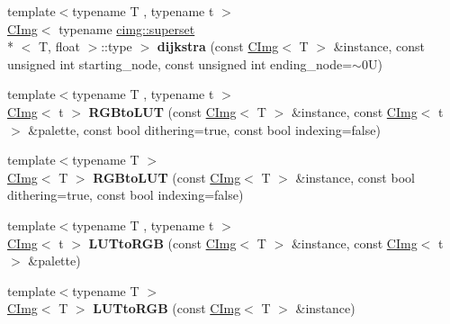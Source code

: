 \begin{DoxyCompactItemize}
\item 
\hypertarget{namespacecimg__library_ac8445474c26aa558fc2d8a1d3cc8eed4}{{\footnotesize template$<$typename T , typename t $>$ }\\\hyperlink{structcimg__library_1_1_c_img}{C\-Img}$<$ typename \hyperlink{structcimg__library_1_1cimg_1_1superset}{cimg\-::superset}\\*
$<$ T, float $>$\-::type $>$ {\bfseries dijkstra} (const \hyperlink{structcimg__library_1_1_c_img}{C\-Img}$<$ T $>$ \&instance, const unsigned int starting\-\_\-node, const unsigned int ending\-\_\-node=$\sim$0\-U)}\label{namespacecimg__library_ac8445474c26aa558fc2d8a1d3cc8eed4}

\item 
\hypertarget{namespacecimg__library_aa8cdecc9881b5ebd03447cdfbeb1a2ad}{{\footnotesize template$<$typename T , typename t $>$ }\\\hyperlink{structcimg__library_1_1_c_img}{C\-Img}$<$ t $>$ {\bfseries R\-G\-Bto\-L\-U\-T} (const \hyperlink{structcimg__library_1_1_c_img}{C\-Img}$<$ T $>$ \&instance, const \hyperlink{structcimg__library_1_1_c_img}{C\-Img}$<$ t $>$ \&palette, const bool dithering=true, const bool indexing=false)}\label{namespacecimg__library_aa8cdecc9881b5ebd03447cdfbeb1a2ad}

\item 
\hypertarget{namespacecimg__library_a0c4e66a44f72e1e6405ee0a91992bc96}{{\footnotesize template$<$typename T $>$ }\\\hyperlink{structcimg__library_1_1_c_img}{C\-Img}$<$ T $>$ {\bfseries R\-G\-Bto\-L\-U\-T} (const \hyperlink{structcimg__library_1_1_c_img}{C\-Img}$<$ T $>$ \&instance, const bool dithering=true, const bool indexing=false)}\label{namespacecimg__library_a0c4e66a44f72e1e6405ee0a91992bc96}

\item 
\hypertarget{namespacecimg__library_a4338ca2180ba976458222e53dfbaf968}{{\footnotesize template$<$typename T , typename t $>$ }\\\hyperlink{structcimg__library_1_1_c_img}{C\-Img}$<$ t $>$ {\bfseries L\-U\-Tto\-R\-G\-B} (const \hyperlink{structcimg__library_1_1_c_img}{C\-Img}$<$ T $>$ \&instance, const \hyperlink{structcimg__library_1_1_c_img}{C\-Img}$<$ t $>$ \&palette)}\label{namespacecimg__library_a4338ca2180ba976458222e53dfbaf968}

\item 
\hypertarget{namespacecimg__library_a842c102920efc93e5b8c100d2cbe5dce}{{\footnotesize template$<$typename T $>$ }\\\hyperlink{structcimg__library_1_1_c_img}{C\-Img}$<$ T $>$ {\bfseries L\-U\-Tto\-R\-G\-B} (const \hyperlink{structcimg__library_1_1_c_img}{C\-Img}$<$ T $>$ \&instance)}\label{namespacecimg__library_a842c102920efc93e5b8c100d2cbe5dce}


\end{DoxyCompactItemize}
